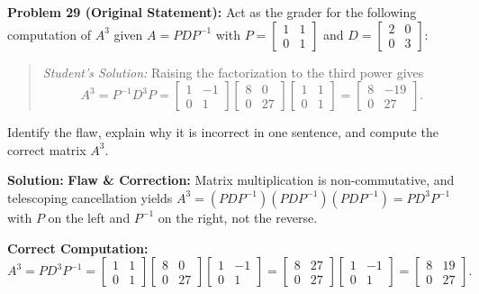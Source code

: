 \documentclass[11pt, letterpaper]{article}
\theoremstyle{definition}
\theoremstyle{remark}
\begin{document}
\vspace{0.8em}
\textbf{Problem 29 (Original Statement):}
Act as the grader for the following computation of $A^{3}$ given $A = PDP^{-1}$ with $P = \begin{bmatrix} 1 & 1 \\ 0 & 1 \end{bmatrix}$ and $D = \begin{bmatrix} 2 & 0 \\ 0 & 3 \end{bmatrix}$:
\begin{quote}
\emph{Student's Solution:} Raising the factorization to the third power gives
\[
A^{3} = P^{-1}D^{3}P = \begin{bmatrix} 1 & -1 \\ 0 & 1 \end{bmatrix} \begin{bmatrix} 8 & 0 \\ 0 & 27 \end{bmatrix} \begin{bmatrix} 1 & 1 \\ 0 & 1 \end{bmatrix} = \begin{bmatrix} 8 & -19 \\ 0 & 27 \end{bmatrix}.
\]
\end{quote}
Identify the flaw, explain why it is incorrect in one sentence, and compute the correct matrix $A^{3}$.

\textbf{Solution:}
\textbf{Flaw \& Correction:} Matrix multiplication is non-commutative, and telescoping cancellation yields $A^{3} = (PDP^{-1})(PDP^{-1})(PDP^{-1}) = PD^{3}P^{-1}$ with $P$ on the left and $P^{-1}$ on the right, not the reverse.

\textbf{Correct Computation:}
\[
A^{3} = PD^{3}P^{-1} = \begin{bmatrix} 1 & 1 \\ 0 & 1 \end{bmatrix}\begin{bmatrix} 8 & 0 \\ 0 & 27 \end{bmatrix}\begin{bmatrix} 1 & -1 \\ 0 & 1 \end{bmatrix} = \begin{bmatrix} 8 & 27 \\ 0 & 27 \end{bmatrix}\begin{bmatrix} 1 & -1 \\ 0 & 1 \end{bmatrix} = \begin{bmatrix} 8 & 19 \\ 0 & 27 \end{bmatrix}.
\]
\end{document}

